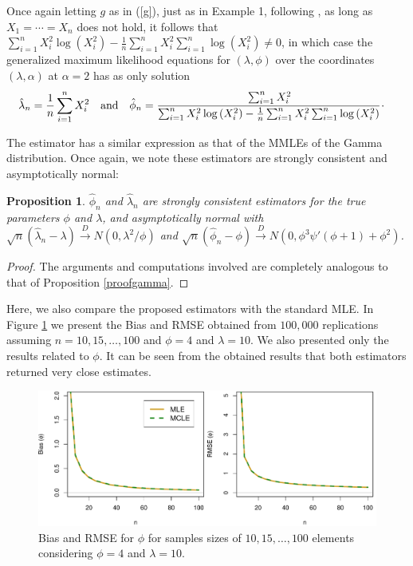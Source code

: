 \documentclass[10pt,a4paper,onecolumn]{article} %
\newtheorem{proposition}[theorem]{Proposition}
\begin{document}
Once again letting $g$ as in (\ref{g}), just as in Example 1, following \cite{ramos2020bias}, as long as $X_1=\cdots=X_n$ does not hold, it follows that $\sum_{i=1}^n X_i^2 \log\left(X_i^2\right) -\frac{1}{n}\sum_{i=1}^n X_i^2\sum_{i=1}^n \log\left(X_i^2\right)\neq 0$, in which case the generalized maximum likelihood equations for $(\lambda,\phi)$ over the coordinates $(\lambda,\alpha)$ at $\alpha=2$ has as only solution
\begin{equation*}\label{vinkom}
\begin{aligned}
&\hat\lambda_n=\frac{1}{n}\sum_{i=1}^n{X_i^2} \ \ \mbox{ and } \ \
\hat\phi_n=\cfrac{\sum_{i=1}^n X_i^{2}}{\sum_{i=1}^{n}X_i^{2} \log\left(X_i^2\right) - \frac{1}{n}\sum_{i=1}^n X_i^{2} \sum_{i=1}^n \log\left(X_i^2\right)} \, \cdot
\end{aligned}
\end{equation*}

The estimator has a similar expression as that of the MMLEs of the Gamma distribution. Once again, we note these estimators are strongly consistent and asymptotically normal:

\begin{proposition}\label{proofnakagami} $\hat\phi_n$ and $\hat\lambda_n$ are strongly consistent estimators for the true parameters $\phi$ and $\lambda$, and asymptotically normal with $\sqrt{n}\left(\hat{\lambda}_n-\lambda\right)\overset{D}{\to} N\left(0,\lambda^2/\phi\right)$ and $\sqrt{n}\left(\hat{\phi}_n-\phi\right)\overset{D}{\to} N\left(0,\phi^3\psi'(\phi+1)+\phi^2\right)$.
\end{proposition}
\begin{proof} The arguments and computations involved are completely analogous to that of Proposition \ref{proofgamma}.
\end{proof}

Here, we also compare the proposed estimators with the standard MLE. In Figure \ref{fg2} we present the Bias and RMSE obtained from $100,000$ replications assuming $n=10,15,\ldots,100$ and $\phi=4$ and $\lambda=10$. We also presented only the results related to $\phi$. It can be seen from the obtained results that both estimators returned very close estimates.

\begin{figure}[!ht]
\centering
\includegraphics[scale=0.6]{biasnakagami.pdf}	
\caption{Bias and RMSE for $\phi$ for samples sizes of $10,15,\ldots,100$ elements considering $\phi=4$ and $\lambda=10$.}\label{fg2}
\end{figure}	
\end{document}
